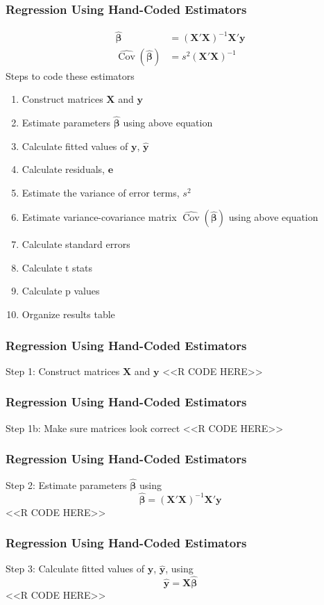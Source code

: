 \documentclass{beamer}
\DeclareMathOperator*{\Cov}{Cov}
\begin{document}
\begin{frame}\frametitle{Regression Using Hand-Coded Estimators}
    \vspace{-3ex}
    \begin{align*}
        \widehat{\bm{\beta}} & = (\bm{X}' \bm{X})^{-1} \bm{X}' \bm{y} \\
        \widehat{\Cov}(\widehat{\bm{\beta}}) & = s^2 (\bm{X}' \bm{X})^{-1}
    \end{align*}
    Steps to code these estimators
    \begin{enumerate}
        \item Construct matrices $\bm{X}$ and $\bm{y}$
        \item Estimate parameters $\widehat{\bm{\beta}}$ using above equation
        \item Calculate fitted values of $\bm{y}$, $\widehat{\bm{y}}$ 
        \item Calculate residuals, $\bm{e}$
        \item Estimate the variance of error terms, $s^2$
        \item Estimate variance-covariance matrix $\widehat{\Cov}(\widehat{\bm{\beta}})$ using above equation
        \item Calculate standard errors
        \item Calculate t stats
        \item Calculate p values
        \item Organize results table
    \end{enumerate}
\end{frame}

\begin{frame}[fragile]\frametitle{Regression Using Hand-Coded Estimators}
    Step 1: Construct matrices $\bm{X}$ and $\bm{y}$
    <<R CODE HERE>>
\end{frame}

\begin{frame}[fragile]\frametitle{Regression Using Hand-Coded Estimators}
    Step 1b: Make sure matrices look correct
    <<R CODE HERE>>
\end{frame}

\begin{frame}[fragile]\frametitle{Regression Using Hand-Coded Estimators}
    Step 2: Estimate parameters $\widehat{\bm{\beta}}$ using
    $$\widehat{\bm{\beta}} = (\bm{X}' \bm{X})^{-1} \bm{X}' \bm{y}$$
    <<R CODE HERE>>
\end{frame}

\begin{frame}[fragile]\frametitle{Regression Using Hand-Coded Estimators}
    Step 3: Calculate fitted values of $\bm{y}$, $\widehat{\bm{y}}$, using
    $$\widehat{\bm{y}} = \bm{X} \widehat{\bm{\beta}}$$
    <<R CODE HERE>>
\end{frame}
\end{document}
